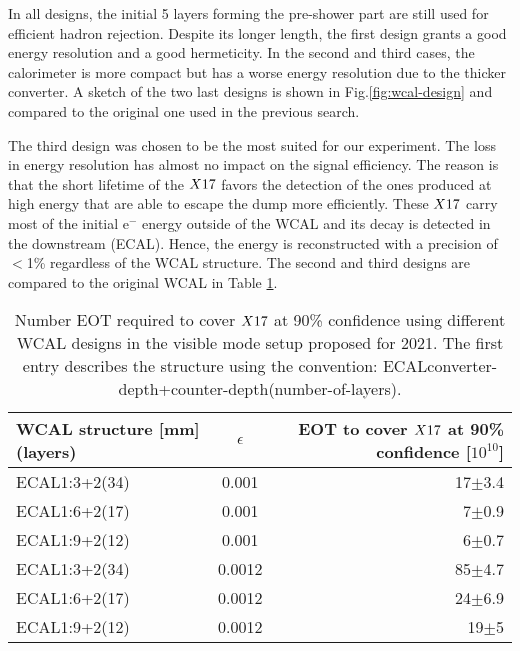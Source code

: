 In all designs, the initial 5 layers forming the pre-shower part are still used for efficient hadron rejection. Despite its longer length, the first design grants a good energy resolution and a good hermeticity. In the second and third cases, the calorimeter is more compact but has a worse energy resolution due to the thicker converter. A sketch of the two last designs is shown in Fig.\ref{fig:wcal-design} and compared to the original one used in the previous search.

The third design was chosen to be the most suited for our experiment. The loss in energy resolution has almost no impact on the signal efficiency. The reason is that the short lifetime of the $X17$ favors the detection of the ones produced at high energy that are able to escape the dump more efficiently. These $X17$ carry most of the initial e$^-$ energy outside of the WCAL and its decay is detected in the downstream (ECAL). Hence, the energy is reconstructed with a precision of $<$1\% regardless of the WCAL structure. The second and third designs are compared to the original WCAL in Table \ref{tab:wcal-length-results}.

\begin{center}
\begin{table}[tbh!]
  \begin{tabular}{|lcr|}
  \hline
  WCAL structure [mm](layers)  & $\epsilon$  & EOT to cover $X17$ at 90\% confidence [$10^{10}$] \\
  \hline
  ECAL1:3+2(34)                & 0.001   & 17$\pm$3.4                                            \\ 
  ECAL1:6+2(17)                & 0.001   & 7$\pm$0.9                                             \\
  ECAL1:9+2(12)                & 0.001   & 6$\pm$0.7                                             \\
  ECAL1:3+2(34)                & 0.0012  & 85$\pm$4.7                                            \\
  ECAL1:6+2(17)                & 0.0012  & 24$\pm$6.9                                            \\  
  ECAL1:9+2(12)                & 0.0012  & 19$\pm$5                                              \\  
  \hline
\end{tabular}
\caption[Possible WCAL designs and  their projected experimental reach]{Number EOT required to cover $X17$ at 90\% confidence using different WCAL designs in the visible mode setup proposed for 2021. The first entry describes the structure using the convention:
  ECALconverter-depth+counter-depth(number-of-layers).}
\label{tab:wcal-length-results}
\end{table}
\end{center}

